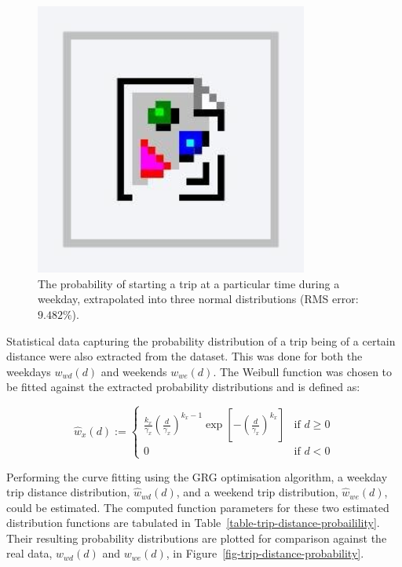 \begin{figure}\centering
 \includegraphics[width=0.8\textwidth]{foo}
 \caption{The probability of starting a trip at a particular time during a weekday, extrapolated into three normal distributions (RMS error: $9.482\%$).}
 \label{fig-starting-a-trip-probability}
\end{figure}

Statistical data capturing the probability distribution of a trip being of a certain distance were also extracted from the dataset. This was done for both the weekdays $w_{wd}(d)$ and weekends $w_{we}(d)$. The Weibull function was chosen to be fitted against the extracted probability distributions and is defined as:

\begin{equation}
\hat{w}_x(d) :=
	\begin{cases}
		\frac{k_x}{\gamma_x}\left(\frac{d}{\gamma_x}\right)^{k_x-1}\exp\left[-\left(\frac{d}{\gamma_x}\right)^{k_x}\right] &\text{if } d \geq 0 \\
		0 &\text{if } d < 0
	\end{cases}
\end{equation}

Performing the curve fitting using the GRG optimisation algorithm, a weekday trip distance distribution, $\hat{w}_{wd}(d)$, and a weekend trip distribution, $\hat{w}_{we}(d)$, could be estimated. The computed function parameters for these two estimated distribution functions are tabulated in Table~\ref{table-trip-distance-probailility}. Their resulting probability distributions are plotted for comparison against the real data, $w_{wd}(d)$ and $w_{we}(d)$, in Figure~\ref{fig-trip-distance-probability}.\\


